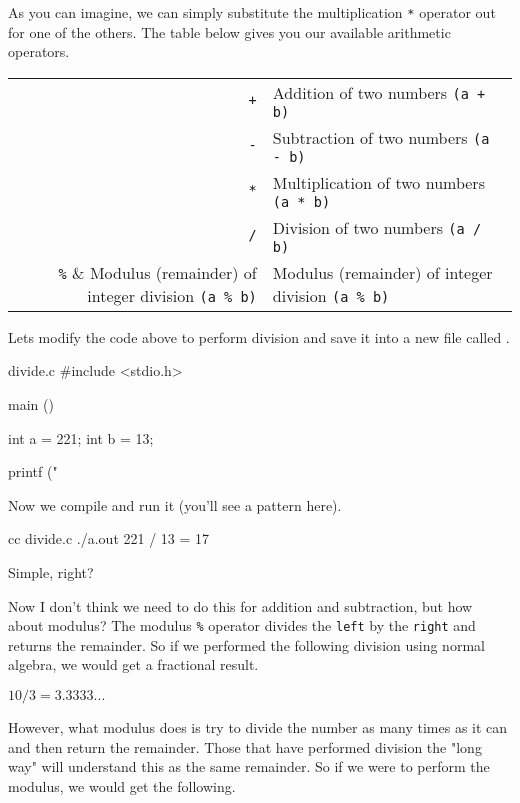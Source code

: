 As you can imagine, we can simply substitute the multiplication \verb|*|
operator out for one of the others. The table below gives you our available
arithmetic operators.

\begin{center}
\begin{tabular}{r l}
\hline
\verb|+| & Addition of two numbers \verb|(a + b)| \\
\verb|-| & Subtraction of two numbers \verb|(a - b)| \\
\verb|*| & Multiplication of two numbers \verb|(a * b)| \\
\verb|/| & Division of two numbers \verb|(a / b)| \\
\verb|%| & Modulus (remainder) of integer division \verb|(a % b)| \\
\hline
\end{tabular}
\end{center}

Lets modify the code above to perform division and save it into a new file
called .

\begin{code}{divide.c}
#include <stdio.h>

main ()
{
    int a = 221;
    int b = 13;

    printf ("%
}
\end{code}

Now we compile  and run it (you'll see a pattern here).

\begin{Terminal}
cc divide.c
./a.out
221 / 13 = 17
\end{Terminal}

Simple, right?

Now I don't think we need to do this for addition and subtraction, but how about
modulus? The modulus \verb|%| operator divides the \verb|left| by the
\verb|right| and returns the remainder. So if we performed the following
division using normal algebra, we would get a fractional result.

\begin{center}
\begin{math}
10 / 3 = 3.3333...
\end{math}
\end{center}

However, what modulus does is try to divide the number as many times as it can
and then return the remainder. Those that have performed division the "long way"
will understand this as the same remainder. So if we were to perform the
modulus, we would get the following.

